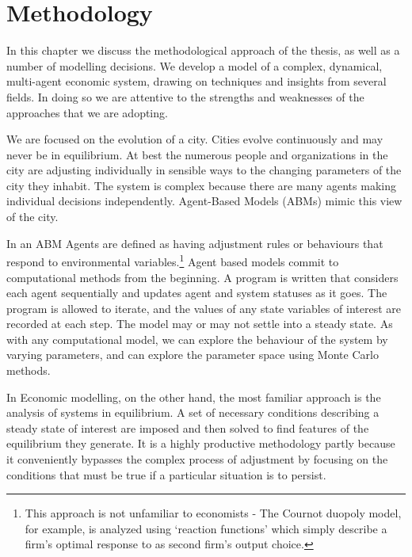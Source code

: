\chapter{Methodology} \label{chapter-methodology}

In this chapter we discuss the methodological approach of the thesis, as well as a number of modelling decisions. We develop a model of a complex, dynamical, multi-agent economic system, drawing on techniques and insights from several fields. In doing so we are attentive to the strengths and weaknesses of the approaches that we are adopting. 

We are focused on the evolution of a city. Cities evolve continuously and may never be in equilibrium. At best the numerous people and organizations in the city are adjusting individually in sensible ways to the changing parameters of the city they inhabit. The system is complex because there are many agents making %
individual decisions independently. %
Agent-Based Models (ABMs) mimic this view of the city.   

In an ABM Agents are defined as having adjustment rules or behaviours that respond to environmental variables.\footnote{This approach is not unfamiliar to economists - The Cournot duopoly model, for example, is analyzed using `reaction functions' which simply describe a firm's optimal response to as second firm's output choice.} Agent based models commit to computational methods from the beginning. A program is written that considers each agent sequentially and updates agent and system statuses as it goes. The program is allowed to iterate, and the values of any state variables of interest are recorded at each step. The model may or may not settle into a steady state. As with any computational model, we can explore the behaviour of the system by varying parameters, and can explore the parameter space using Monte Carlo methods.

In Economic modelling, on the other hand, the most familiar approach is the  analysis of systems in equilibrium. A set of necessary conditions describing a steady state of interest are imposed and then solved to find features of the equilibrium they generate. It is a highly productive methodology partly because it conveniently  bypasses the complex process of adjustment by focusing on the conditions that must be true if a particular situation is to persist.


